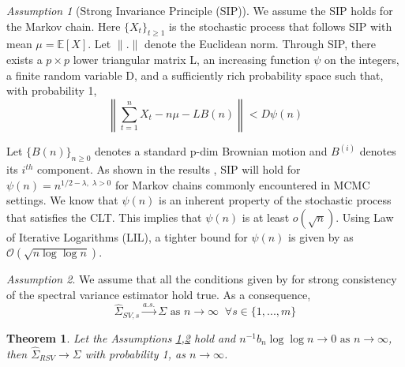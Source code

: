 \documentclass[11pt]{article}
\newtheorem{theorem}{Theorem}
\theoremstyle{remark}
\newtheorem{ass}{Assumption}
\begin{document}
\begin{ass}[Strong Invariance Principle (SIP)] \label{ass:sip}
    We assume the SIP holds for the Markov chain. Here $\{X_t\}_{t\geq 1}$ is the stochastic process that follows SIP with mean $\mu = \mathbb{E}[X]$. Let $\|.\|$ denote the Euclidean norm. Through SIP, there exists a $p \times p$ lower triangular matrix L, an increasing function $\psi$ on the integers, a finite random variable D, and a  sufficiently rich probability space such that, with probability 1, \\
  $$\left\|\sum_{t=1}^{n}X_t - n\mu - LB(n)\right\| < D\psi(n)$$
  
  Let $\{B(n)\}_{n\geq 0}$ denotes a standard p-dim Brownian motion and $B^{(i)}$ denotes its $i^{th}$ component. As shown in the results \cite{kuelbs1980almost}, SIP will hold for $\psi(n) = n^{1/2 - \lambda, \; \lambda > 0}$ for Markov chains commonly encountered in MCMC settings. We know that $\psi(n)$ is an inherent property of the stochastic process that satisfies the CLT. This implies that $\psi(n)$ is at least $o(\sqrt{n})$. Using Law of Iterative Logarithms (LIL), a tighter bound for $\psi(n)$ is given by \cite{stra:1964} as $\mathcal{O}(\sqrt{n\log \log n})$.
\end{ass}


\begin{ass} \label{ass:sve_consis} We assume that all the conditions given by \cite{vats:fleg:jon:2018} for strong consistency of the spectral variance estimator hold true. As a consequence, 
\[
\hat{\Sigma}_{SV,s} \xrightarrow{a.s.} \Sigma \textrm{ as } n \to \infty \;\; \forall s \in \{1,..., m\}
\]
\end{ass}




\begin{theorem}
\label{th:consistency}
 Let the Assumptions \ref{ass:sip},\ref{ass:sve_consis} hold and $n^{-1}{b_n \log \log n} \to 0 \textrm{ as } n \to \infty$, then $\hat{\Sigma}_{RSV} \to \Sigma$ with probability 1, as $n \to \infty$.
\end{theorem} 
\end{document}
